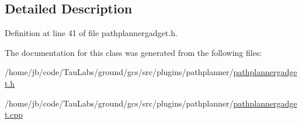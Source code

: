 \subsection{\-Detailed \-Description}


\-Definition at line 41 of file pathplannergadget.\-h.



\-The documentation for this class was generated from the following files\-:\begin{DoxyCompactItemize}
\item 
/home/jb/code/\-Tau\-Labs/ground/gcs/src/plugins/pathplanner/\hyperlink{pathplannergadget_8h}{pathplannergadget.\-h}\item 
/home/jb/code/\-Tau\-Labs/ground/gcs/src/plugins/pathplanner/\hyperlink{pathplannergadget_8cpp}{pathplannergadget.\-cpp}\end{DoxyCompactItemize}
